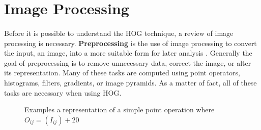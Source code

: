 \documentclass[11pt]{article}
\newcommand\simpleparagraph[1]{%
	\stepcounter{paragraph}\paragraph*{\theparagraph\quad{}#1}}
\renewcommand\theparagraph{}
\begin{document}
\section{Image Processing}
\simpleparagraph{}
Before it is possible to understand the HOG \cite{dalal_histograms_2005} technique, a review of image processing is necessary. \textbf{Preprocessing}\label{Preprocessing} is the use of image processing to convert the input, an image, into a more suitable form for later analysis \cite{szeliski_computer_2011}. Generally the goal of preprocessing is to remove unnecessary data, correct the image, or alter its representation. Many of these tasks are computed using point operators, histograms, filters, gradients, or image pyramids. As a matter of fact, all of these tasks are necessary when using HOG.
\begin{figure}[h]
	\centering
	\hfill
	\hfill
	\caption{Examples a representation of a simple point operation where $O_{ij} = (I_{ij})+20$}
	\label{fig:pointFunction}
\end{figure}
\end{document}
